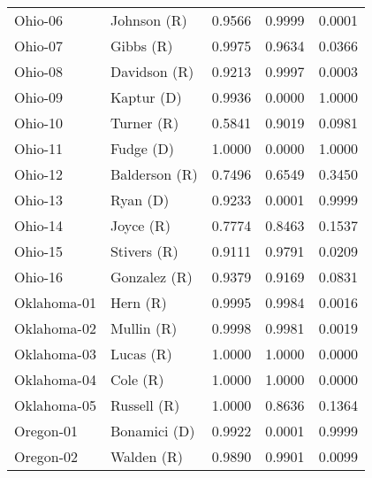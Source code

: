 \begin{longtable}{llrll}
           Ohio-06 &           {\color{Red} Johnson (R)} &       0.9566 &        0.9999 &        0.0001 \\
           Ohio-07 &             {\color{Red} Gibbs (R)} &       0.9975 &        0.9634 &        0.0366 \\
           Ohio-08 &          {\color{Red} Davidson (R)} &       0.9213 &        0.9997 &        0.0003 \\
           Ohio-09 &           {\color{Blue} Kaptur (D)} &       0.9936 &        0.0000 &        1.0000 \\
           Ohio-10 &            {\color{Red} Turner (R)} &       0.5841 &        0.9019 &        0.0981 \\
           Ohio-11 &            {\color{Blue} Fudge (D)} &       1.0000 &        0.0000 &        1.0000 \\
           Ohio-12 &         {\color{Red} Balderson (R)} &       0.7496 &        0.6549 &        0.3450 \\
           Ohio-13 &             {\color{Blue} Ryan (D)} &       0.9233 &        0.0001 &        0.9999 \\
           Ohio-14 &             {\color{Red} Joyce (R)} &       0.7774 &        0.8463 &        0.1537 \\
           Ohio-15 &           {\color{Red} Stivers (R)} &       0.9111 &        0.9791 &        0.0209 \\
           Ohio-16 &          {\color{Red} Gonzalez (R)} &       0.9379 &        0.9169 &        0.0831 \\
       Oklahoma-01 &              {\color{Red} Hern (R)} &       0.9995 &        0.9984 &        0.0016 \\
       Oklahoma-02 &            {\color{Red} Mullin (R)} &       0.9998 &        0.9981 &        0.0019 \\
       Oklahoma-03 &             {\color{Red} Lucas (R)} &       1.0000 &        1.0000 &        0.0000 \\
       Oklahoma-04 &              {\color{Red} Cole (R)} &       1.0000 &        1.0000 &        0.0000 \\
       Oklahoma-05 &           {\color{Red} Russell (R)} &       1.0000 &        0.8636 &        0.1364 \\
         Oregon-01 &         {\color{Blue} Bonamici (D)} &       0.9922 &        0.0001 &        0.9999 \\
         Oregon-02 &            {\color{Red} Walden (R)} &       0.9890 &        0.9901 &        0.0099 \\

\end{longtable}
